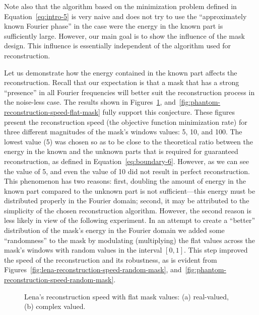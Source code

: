 Note also that the algorithm based on the minimization problem defined
in Equation~\eqref{eq:intro-5} is very naive and does
not try to use the ``approximately known Fourier phase'' in the case
were the energy in the known part is sufficiently large. However, our
main goal is to show the influence of the mask design. This influence
is essentially independent of the algorithm used for reconstruction. 

Let us demonstrate how the energy contained in the known part affects
the reconstruction. Recall that our expectation is that a mask that
has a strong ``presence'' in all Fourier frequencies will better suit
the reconstruction process in the noise-less case. The results shown
in Figures~\ref{fig:lena-reconstruction-speed-flat-mask},
and~\ref{fig:phantom-reconstruction-speed-flat-mask} fully support
this conjecture. These figures present the reconstruction speed (the
objective function minimization rate) for three different magnitudes
of the mask's windows values: 5, 10, and 100. The lowest value (5) was
chosen so as to be close to the theoretical ratio between the energy in
the known and the unknown parts that is required for guaranteed
reconstruction, as defined in Equation~\eqref{eq:boundary-6}. However, as
we can see the value of 5, and even the value of 10 did not result in
perfect reconstruction. This phenomenon has two reasons: first, 
doubling the amount of energy in the known part compared to the unknown part
is not sufficient---this energy must be distributed properly in the
Fourier domain; second, it may be attributed to the simplicity of the
chosen reconstruction algorithm. However, the second reason is less
likely in view of the following experiment. In an attempt to create a
``better'' distribution of the mask's energy in the Fourier domain we
added some ``randomness'' to the mask by modulating (multiplying) the
flat values across the mask's windows with random values in the
interval $[0,1]$. This step improved the speed of the reconstruction
and its robustness, as is evident from 
Figures~\ref{fig:lena-reconstruction-speed-random-mask},
and~\ref{fig:phantom-reconstruction-speed-random-mask}.

\begin{figure}[H]
  \centering
  \quad{}
  \caption[Lena's reconstruction speed with flat mask
  values.]{Lena's reconstruction speed with flat mask values: (a)
    real-valued, (b) complex valued.}
  \label{fig:lena-reconstruction-speed-flat-mask}
\end{figure}

